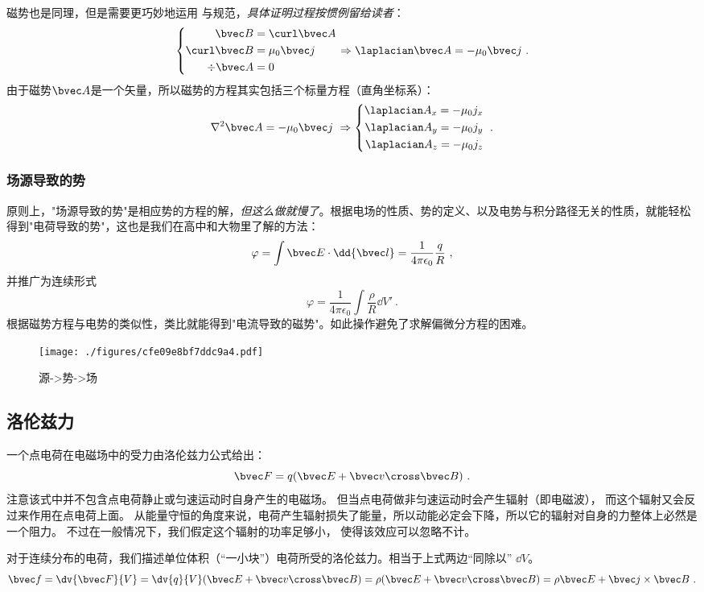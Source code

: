 磁势也是同理，但是需要更巧妙地运用 与规范，\textsl{具体证明过程按惯例留给读者}：
$$
\left \{
\begin{aligned}
\bvec B &= \curl \bvec A\\
\curl \bvec B &= \mu_0 \bvec  j\\
\div \bvec A &= 0\\
\end{aligned}
\right.
\Rightarrow
\laplacian \bvec A = -\mu_0 \bvec j
~.
$$
由于磁势$\bvec A$是一个矢量，所以磁势的方程其实包括三个标量方程（直角坐标系）：
$$
\nabla^2 \bvec A = - \mu_0 \bvec j~
\Rightarrow
\left \{
\begin{aligned}
\laplacian A_x = -\mu_0 j_x\\
\laplacian A_y = -\mu_0 j_y\\
\laplacian A_z = -\mu_0 j_z\\
\end{aligned}
\right.
~.
$$

\subsubsection{场源导致的势}
原则上，"场源导致的势"是相应势的方程的解，\textsl{但这么做就慢了}。根据电场的性质、势的定义、以及电势与积分路径无关的性质，就能轻松得到"电荷导致的势"，这也是我们在高中和大物里了解的方法：
$$\varphi = \int \bvec E \cdot \dd {\bvec l} = \frac{1}{4\pi\epsilon_0} \frac{q}{R}~,$$
并推广为连续形式
$$\varphi = \frac{1}{4\pi\epsilon_0} \int \frac{\rho}{R} \dd V'~.$$
根据磁势方程与电势的类似性，类比就能得到"电流导致的磁势"。如此操作避免了求解偏微分方程的困难。

\begin{figure}[ht]
\centering
\texttt{[image: ./figures/cfe09e8bf7ddc9a4.pdf]}
\caption{源->势->场} \label{fig_estfid_2}
\end{figure}

\subsection{洛伦兹力}
一个点电荷在电磁场中的受力由洛伦兹力公式给出：
$$
\bvec F = q (\bvec E + \bvec v \cross \bvec B)~.
$$
注意该式中并不包含点电荷静止或匀速运动时自身产生的电磁场。 但当点电荷做非匀速运动时会产生辐射（即电磁波）， 而这个辐射又会反过来作用在点电荷上面。 从能量守恒的角度来说，电荷产生辐射损失了能量，所以动能必定会下降，所以它的辐射对自身的力整体上必然是一个阻力。 不过在一般情况下，我们假定这个辐射的功率足够小， 使得该效应可以忽略不计。

对于连续分布的电荷，我们描述单位体积（“一小块”）电荷所受的洛伦兹力。相当于上式两边“同除以” $\dd V$。
$$\bvec f = \dv{\bvec F}{V} = \dv{q}{V} (\bvec E + \bvec v \cross \bvec B) = \rho (\bvec E + \bvec v \cross \bvec B)=\rho \bvec E + \bvec j \times \bvec B ~.$$
